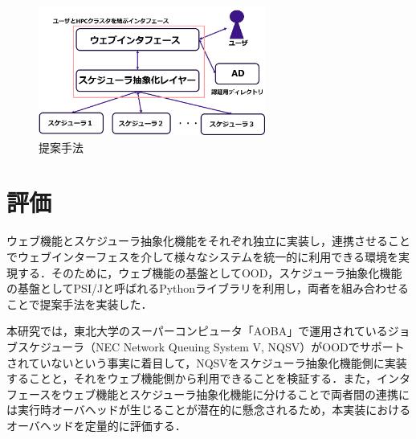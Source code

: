 \documentclass[a4paper,oneside,twocolumn,notitlepage,dvipdfmx]{jsarticle}
\begin{document}
\begin{figure}[h]
  \centering
  \includegraphics[width=75mm]{./fig/fig1.png}
  \caption{提案手法}
  \label{fig1}
\end{figure}

\section{評価}
ウェブ機能とスケジューラ抽象化機能をそれぞれ独立に実装し，連携させることでウェブインターフェスを介して様々なシステムを統一的に利用できる環境を実現する．そのために，ウェブ機能の基盤としてOOD，スケジューラ抽象化機能の基盤としてPSI/J\cite{citation_6}と呼ばれるPythonライブラリを利用し，両者を組み合わせることで提案手法を実装した．\par
本研究では，東北大学のスーパーコンピュータ「AOBA」で運用されているジョブスケジューラ（NEC Network Queuing System V, NQSV）がOODでサポートされていないという事実に着目して，NQSVをスケジューラ抽象化機能側に実装することと，それをウェブ機能側から利用できることを検証する．また，インタフェースをウェブ機能とスケジューラ抽象化機能に分けることで両者間の連携には実行時オーバヘッドが生じることが潜在的に懸念されるため，本実装におけるオーバヘッドを定量的に評価する．\par
\end{document}

